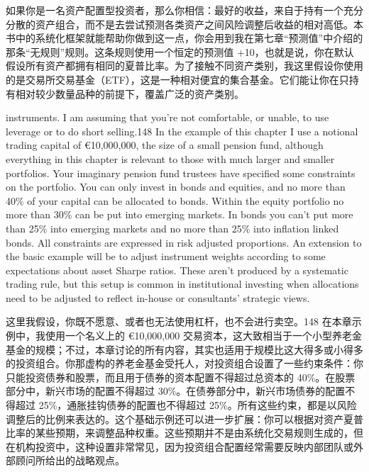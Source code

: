 \begin{chineseblock}如果你是一名资产配置型投资者，那么你相信：最好的收益，来自于持有一个充分分散的资产组合，而不是去尝试预测各类资产之间风险调整后收益的相对高低。本书中的系统化框架就能帮助你做到这一点，你会用到我在第七章“预测值”中介绍的那条“无规则”规则。这条规则使用一个恒定的预测值 +10，也就是说，你在默认假设所有资产都拥有相同的夏普比率。为了接触不同资产类别，我这里假设你使用的是交易所交易基金（ETF），这是一种相对便宜的集合基金。它们能让你在只持有相对较少数量品种的前提下，覆盖广泛的资产类别。\end{chineseblock}

\bipairgap

\begin{englishblock} instruments. I am assuming that you're not comfortable, or unable, to use leverage or to do short selling.148 In the example of this chapter I use a notional trading capital of €10,000,000, the size of a small pension fund, although everything in this chapter is relevant to those with much larger and smaller portfolios. Your imaginary pension fund trustees have specified some constraints on the portfolio. You can only invest in bonds and equities, and no more than 40\% of your capital can be allocated to bonds. Within the equity portfolio no more than 30\% can be put into emerging markets. In bonds you can't put more than 25\% into emerging markets and no more than 25\% into inflation linked bonds. All constraints are expressed in risk adjusted proportions. An extension to the basic example will be to adjust instrument weights according to some expectations about asset Sharpe ratios. These aren't produced by a systematic trading rule, but this setup is common in institutional investing when allocations need to be adjusted to reflect in-house or consultants' strategic views. \end{englishblock}

\begin{chineseblock}这里我假设，你既不愿意、或者也无法使用杠杆，也不会进行卖空。148 在本章示例中，我使用一个名义上的 €10,000,000 交易资本，这大致相当于一个小型养老金基金的规模；不过，本章讨论的所有内容，其实也适用于规模比这大得多或小得多的投资组合。你那虚构的养老金基金受托人，对投资组合设置了一些约束条件：你只能投资债券和股票，而且用于债券的资本配置不得超过总资本的 40\%。在股票部分中，新兴市场的配置不得超过 30\%。在债券部分中，新兴市场债券的配置不得超过 25\%，通胀挂钩债券的配置也不得超过 25\%。所有这些约束，都是以风险调整后的比例来表达的。这个基础示例还可以进一步扩展：你可以根据对资产夏普比率的某些预期，来调整品种权重。这些预期并不是由系统化交易规则生成的，但在机构投资中，这种设置非常常见，因为投资组合配置经常需要反映内部团队或外部顾问所给出的战略观点。\end{chineseblock}

